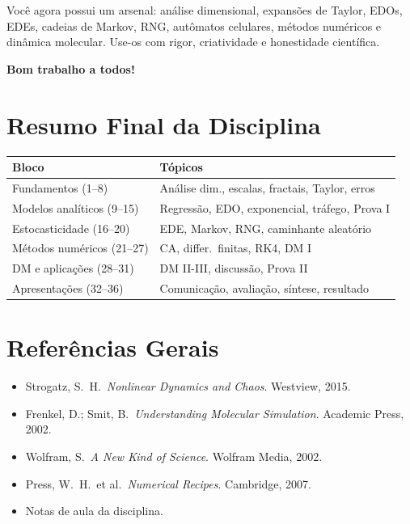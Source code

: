 \documentclass[12pt,a4paper]{article}
\begin{document}
Voc\^e agora possui um arsenal: an\'alise dimensional, expans\~oes de Taylor, EDOs, EDEs, cadeias de Markov, RNG, aut\^omatos celulares, m\'etodos num\'ericos e din\^amica molecular. Use-os com rigor, criatividade e honestidade cient\'ifica.

\medskip
\noindent\textbf{Bom trabalho a todos!}

\section*{Resumo Final da Disciplina}

\begin{tabular}{|l|l|}
\hline
\textbf{Bloco} & \textbf{T\'opicos} \\
\hline
Fundamentos (1--8) & An\'alise dim., escalas, fractais, Taylor, erros \\
Modelos anal\'iticos (9--15) & Regressão, EDO, exponencial, tr\'afego, Prova I \\
Estocasticidade (16--20) & EDE, Markov, RNG, caminhante aleat\'orio \\
M\'etodos num\'ericos (21--27) & CA, differ.\ finitas, RK4, DM I \\
DM e aplica\c{c}\~oes (28--31) & DM II-III, discuss\~ao, Prova II \\
Apresenta\c{c}\~oes (32--36) & Comunica\c{c}\~ao, avalia\c{c}\~ao, s\'intese, resultado \\
\hline
\end{tabular}

\section*{Refer\^encias Gerais}
\begin{itemize}
  \item Strogatz, S.\ H.\ \textit{Nonlinear Dynamics and Chaos}. Westview, 2015.
  \item Frenkel, D.; Smit, B.\ \textit{Understanding Molecular Simulation}. Academic Press, 2002.
  \item Wolfram, S.\ \textit{A New Kind of Science}. Wolfram Media, 2002.
  \item Press, W.\ H.\ et al.\ \textit{Numerical Recipes}. Cambridge, 2007.
  \item Notas de aula da disciplina.
\end{itemize}
\end{document}
